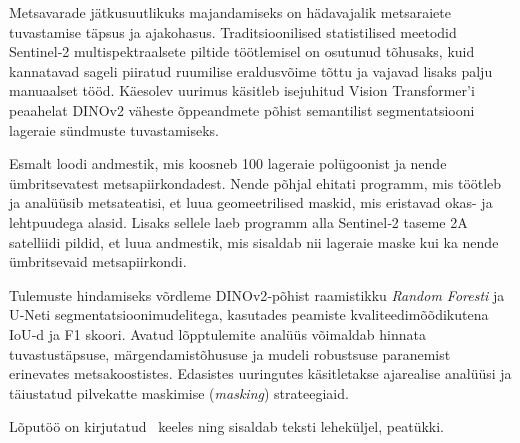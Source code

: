 Metsavarade jätkusuutlikuks majandamiseks on hädavajalik metsaraiete tuvastamise täpsus ja ajakohasus. Traditsioonilised statistilised meetodid Sentinel‑2 multispektraalsete piltide töötlemisel on osutunud tõhusaks, kuid kannatavad sageli piiratud ruumilise eraldusvõime tõttu ja vajavad lisaks palju manuaalset tööd. Käesolev uurimus käsitleb isejuhitud Vision Transformer’i peaahelat DINOv2 väheste õppeandmete põhist semantilist segmentatsiooni lageraie sündmuste tuvastamiseks.

Esmalt loodi andmestik, mis koosneb 100 lageraie polügoonist ja nende ümbritsevatest metsapiirkondadest. Nende põhjal ehitati programm, mis töötleb ja analüüsib metsateatisi, et luua geomeetrilised maskid, mis eristavad okas- ja lehtpuudega alasid. Lisaks sellele laeb programm alla Sentinel‑2 taseme 2A satelliidi pildid, et luua andmestik, mis sisaldab nii lageraie maske kui ka nende ümbritsevaid metsapiirkondi.

Tulemuste hindamiseks võrdleme DINOv2‑põhist raamistikku \textit{Random Foresti} ja U‑Neti segmentatsioonimudelitega, kasutades peamiste kvaliteedimõõdikutena IoU‑d ja F1 skoori. Avatud lõpptulemite analüüs võimaldab hinnata tuvastustäpsuse, märgendamistõhususe ja mudeli robustsuse paranemist erinevates metsakoostistes. Edasistes uuringutes käsitletakse ajarealise analüüsi ja täiustatud pilvekatte maskimise (\textit{masking}) strateegiaid.

Lõputöö on kirjutatud \langEst~keeles ning sisaldab teksti \calculatepages leheküljel, 
 peatükki.